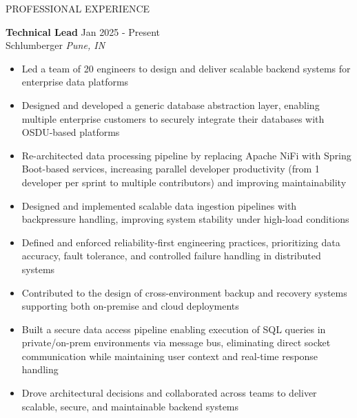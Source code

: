 \documentclass{resume} %
\begin{document}
\begin{rSection}{PROFESSIONAL EXPERIENCE}

\textbf{Technical Lead} \hfill Jan 2025 - Present\\
Schlumberger \hfill \textit{Pune, IN}
 \begin{itemize}
    \itemsep -3pt {} 
     \item Led a team of 20 engineers to design and deliver scalable backend systems for enterprise data platforms
     \item Designed and developed a generic database abstraction layer, enabling multiple enterprise customers to securely integrate their databases with OSDU-based platforms
     \item Re-architected data processing pipeline by replacing Apache NiFi with Spring Boot-based services, increasing parallel developer productivity (from 1 developer per sprint to multiple contributors) and improving maintainability
     \item Designed and implemented scalable data ingestion pipelines with backpressure handling, improving system stability under high-load conditions
     \item Defined and enforced reliability-first engineering practices, prioritizing data accuracy, fault tolerance, and controlled failure handling in distributed systems
     \item Contributed to the design of cross-environment backup and recovery systems supporting both on-premise and cloud deployments
     \item Built a secure data access pipeline enabling execution of SQL queries in private/on-prem environments via message bus, eliminating direct socket communication while maintaining user context and real-time response handling
     \item Drove architectural decisions and collaborated across teams to deliver scalable, secure, and maintainable backend systems
 \end{itemize}
 

\end{rSection}
\end{document}
